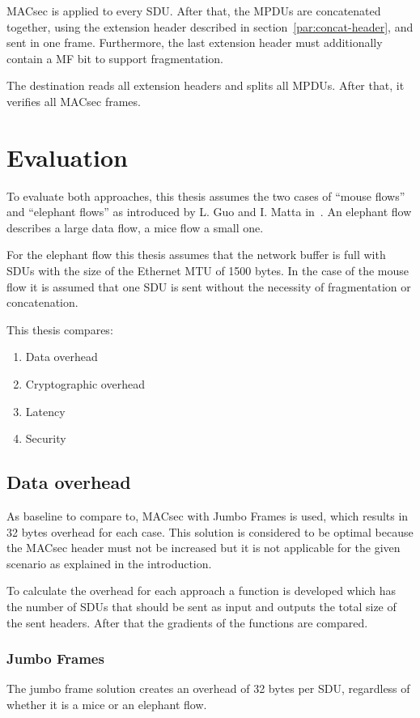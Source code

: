 \gls{MACsec} is applied to every \gls{SDU}.
After that, the \glspl{MPDU} are concatenated together, using the extension header described in section~\ref{par:concat-header}, and sent in one frame.
Furthermore, the last extension header must additionally contain a \gls{MF} bit to support fragmentation.

The destination reads all extension headers and splits all \glspl{MPDU}.
After that, it verifies all \gls{MACsec} frames.

\section{Evaluation}
To evaluate both approaches, this thesis assumes the two cases of ``mouse flows'' and ``elephant flows'' as introduced by L. Guo and I. Matta in~\cite{miceandelephants}.
An elephant flow describes a large data flow, a mice flow a small one.

For the elephant flow this thesis assumes that the network buffer is full with \glspl{SDU} with the size of the Ethernet \gls{MTU} of 1500 bytes.
In the case of the mouse flow it is assumed that one \gls{SDU} is sent without the necessity of fragmentation or concatenation.

This thesis compares:
\begin{enumerate}
  \item Data overhead
  \item Cryptographic overhead
  \item Latency
  \item Security
\end{enumerate}

\subsection{Data overhead}
As baseline to compare to, \gls{MACsec} with Jumbo Frames is used, which results in 32 bytes overhead for each case.
This solution is considered to be optimal because the \gls{MACsec} header must not be increased but it is not applicable for the given scenario as explained in the introduction.

To calculate the overhead for each approach a function is developed which has the number of \glspl{SDU} that should be sent as input and outputs the total size of the sent headers.
After that the gradients of the functions are compared.

\subsubsection{Jumbo Frames}
The jumbo frame solution creates an overhead of 32 bytes per \gls{SDU}, regardless of whether it is a mice or an elephant flow.

